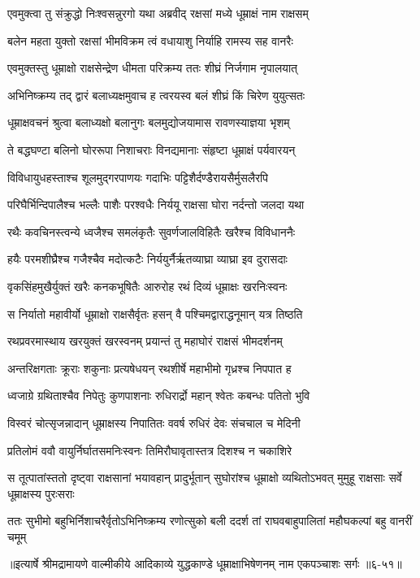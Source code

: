 \twolineshloka
{एवमुक्त्वा तु संक्रुद्धो निःश्वसन्नुरगो यथा}
{अब्रवीद् रक्षसां मध्ये धूम्राक्षं नाम राक्षसम्} %

\twolineshloka
{बलेन महता युक्तो रक्षसां भीमविक्रम}
{त्वं वधायाशु निर्याहि रामस्य सह वानरैः} %

\twolineshloka
{एवमुक्तस्तु धूम्राक्षो राक्षसेन्द्रेण धीमता}
{परिक्रम्य ततः शीघ्रं निर्जगाम नृपालयात्} %

\twolineshloka
{अभिनिष्क्रम्य तद् द्वारं बलाध्यक्षमुवाच ह}
{त्वरयस्व बलं शीघ्रं किं चिरेण युयुत्सतः} %

\twolineshloka
{धूम्राक्षवचनं श्रुत्वा बलाध्यक्षो बलानुगः}
{बलमुद्योजयामास रावणस्याज्ञया भृशम्} %

\twolineshloka
{ते बद्धघण्टा बलिनो घोररूपा निशाचराः}
{विनद्यमानाः संहृष्टा धूम्राक्षं पर्यवारयन्} %

\twolineshloka
{विविधायुधहस्ताश्च शूलमुद्गरपाणयः}
{गदाभिः पट्टिशैर्दण्डैरायसैर्मुसलैरपि} %

\twolineshloka
{परिघैर्भिन्दिपालैश्च भल्लैः पाशैः परश्वधैः}
{निर्ययू राक्षसा घोरा नर्दन्तो जलदा यथा} %

\twolineshloka
{रथैः कवचिनस्त्वन्ये ध्वजैश्च समलंकृतैः}
{सुवर्णजालविहितैः खरैश्च विविधाननैः} %

\twolineshloka
{हयैः परमशीघ्रैश्च गजैश्चैव मदोत्कटैः}
{निर्ययुर्नैर्ऋतव्याघ्रा व्याघ्रा इव दुरासदाः} %

\twolineshloka
{वृकसिंहमुखैर्युक्तं खरैः कनकभूषितैः}
{आरुरोह रथं दिव्यं धूम्राक्षः खरनिःस्वनः} %

\twolineshloka
{स निर्यातो महावीर्यो धूम्राक्षो राक्षसैर्वृतः}
{हसन् वै पश्चिमद्वाराद्धनूमान् यत्र तिष्ठति} %

\twolineshloka
{रथप्रवरमास्थाय खरयुक्तं खरस्वनम्}
{प्रयान्तं तु महाघोरं राक्षसं भीमदर्शनम्} %

\twolineshloka
{अन्तरिक्षगताः क्रूराः शकुनाः प्रत्यषेधयन्}
{रथशीर्षे महाभीमो गृध्रश्च निपपात ह} %

\twolineshloka
{ध्वजाग्रे ग्रथिताश्चैव निपेतुः कुणपाशनाः}
{रुधिरार्द्रो महान् श्वेतः कबन्धः पतितो भुवि} %

\twolineshloka
{विस्वरं चोत्सृजन्नादान् धूम्राक्षस्य निपातितः}
{ववर्ष रुधिरं देवः संचचाल च मेदिनी} %

\twolineshloka
{प्रतिलोमं ववौ वायुर्निर्घातसमनिःस्वनः}
{तिमिरौघावृतास्तत्र दिशश्च न चकाशिरे} %

\threelineshloka
{स तूत्पातांस्ततो दृष्ट्वा राक्षसानां भयावहान्}
{प्रादुर्भूतान् सुघोरांश्च धूम्राक्षो व्यथितोऽभवत्}
{मुमुहू राक्षसाः सर्वे धूम्राक्षस्य पुरःसराः} %

\twolineshloka
{ततः सुभीमो बहुभिर्निशाचरैर्वृतोऽभिनिष्क्रम्य रणोत्सुको बली}
{ददर्श तां राघवबाहुपालितां महौघकल्पां बहु वानरीं चमूम्} %


॥इत्यार्षे श्रीमद्रामायणे वाल्मीकीये आदिकाव्ये युद्धकाण्डे धूम्राक्षाभिषेणनम् नाम एकपञ्चाशः सर्गः ॥६-५१॥
